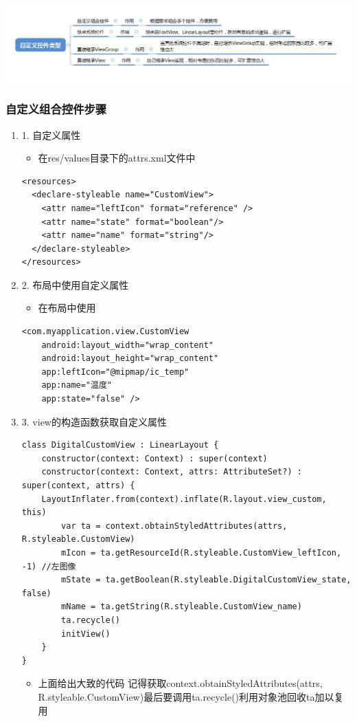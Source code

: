 \documentclass[9pt, b5paper]{article}
\begin{document}
\includegraphics[width=.9\linewidth]{./pic/selfviews.png}

\subsubsection{自定义组合控件步骤}
\label{sec-1-3-1}
\begin{enumerate}
\item 1. 自定义属性
\label{sec-1-3-1-1}
\begin{itemize}
\item 在res/values目录下的attrs.xml文件中
\end{itemize}
\begin{verbatim}
<resources>
  <declare-styleable name="CustomView">
    <attr name="leftIcon" format="reference" />
    <attr name="state" format="boolean"/>
    <attr name="name" format="string"/>
  </declare-styleable>
</resources>
\end{verbatim}
\item 2. 布局中使用自定义属性
\label{sec-1-3-1-2}
\begin{itemize}
\item 在布局中使用
\end{itemize}
\begin{verbatim}
<com.myapplication.view.CustomView
    android:layout_width="wrap_content"
    android:layout_height="wrap_content"
    app:leftIcon="@mipmap/ic_temp"
    app:name="温度"
    app:state="false" />
\end{verbatim}
\item 3. view的构造函数获取自定义属性
\label{sec-1-3-1-3}
\begin{verbatim}
class DigitalCustomView : LinearLayout {
    constructor(context: Context) : super(context)
    constructor(context: Context, attrs: AttributeSet?) : super(context, attrs) {
    LayoutInflater.from(context).inflate(R.layout.view_custom, this)
        var ta = context.obtainStyledAttributes(attrs, R.styleable.CustomView)
        mIcon = ta.getResourceId(R.styleable.CustomView_leftIcon, -1) //左图像
        mState = ta.getBoolean(R.styleable.DigitalCustomView_state, false)
        mName = ta.getString(R.styleable.CustomView_name)
        ta.recycle()
        initView()
    }
}
\end{verbatim}
\begin{itemize}
\item 上面给出大致的代码 记得获取context.obtainStyledAttributes(attrs, R.styleable.CustomView)最后要调用ta.recycle()利用对象池回收ta加以复用
\end{itemize}
\end{enumerate}
\end{document}
